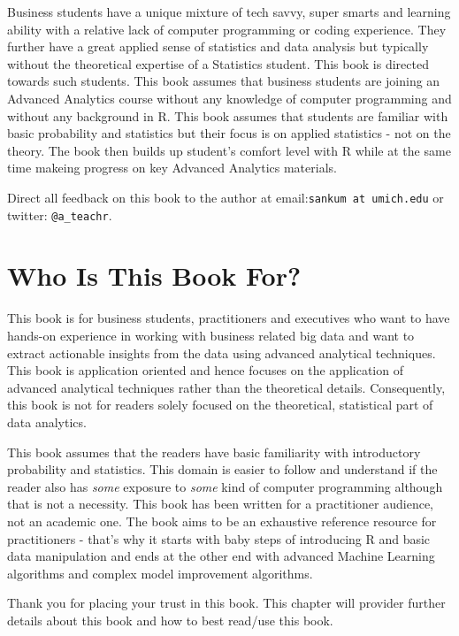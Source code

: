 \documentclass[]{krantz}
\begin{document}
Business students have a unique mixture of tech savvy, super smarts and
learning ability with a relative lack of computer programming or coding
experience. They further have a great applied sense of statistics and
data analysis but typically without the theoretical expertise of a
Statistics student. This book is directed towards such students. This
book assumes that business students are joining an Advanced Analytics
course without any knowledge of computer programming and without any
background in R. This book assumes that students are familiar with basic
probability and statistics but their focus is on applied statistics -
not on the theory. The book then builds up student's comfort level with
R while at the same time makeing progress on key Advanced Analytics
materials.

Direct all feedback on this book to the author at
email:\texttt{sankum\ at\ umich.edu} or twitter: \texttt{@a\_teachr}.

\section*{Who Is This Book For?}\label{who-is-this-book-for}


This book is for business students, practitioners and executives who
want to have hands-on experience in working with business related big
data and want to extract actionable insights from the data using
advanced analytical techniques. This book is application oriented and
hence focuses on the application of advanced analytical techniques
rather than the theoretical details. Consequently, this book is not for
readers solely focused on the theoretical, statistical part of data
analytics.

This book assumes that the readers have basic familiarity with
introductory probability and statistics. This domain is easier to follow
and understand if the reader also has \emph{some} exposure to
\emph{some} kind of computer programming although that is not a
necessity. This book has been written for a practitioner audience, not
an academic one. The book aims to be an exhaustive reference resource
for practitioners - that's why it starts with baby steps of introducing
R and basic data manipulation and ends at the other end with advanced
Machine Learning algorithms and complex model improvement algorithms.

Thank you for placing your trust in this book. This chapter will
provider further details about this book and how to best read/use this
book.
\end{document}
